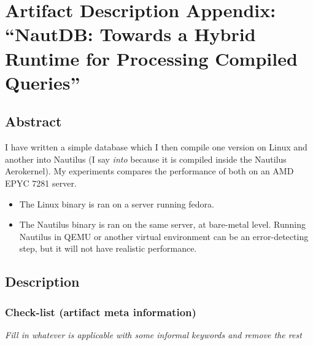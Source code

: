 \documentclass{IEEEtran}
\begin{document}

\appendices

\section{Artifact Description Appendix: ``NautDB: Towards a Hybrid Runtime for Processing Compiled Queries''}

\subsection{Abstract}

I have written a simple database which I then compile one version on Linux and another into Nautilus (I say \textit{into} because it is compiled inside the Nautilus Aerokernel). My experiments compares the performance of both on an AMD EPYC 7281 server.

\begin{itemize}
\item The Linux binary is ran on a server running fedora.
\item The Nautilus binary is ran on the same server, at bare-metal level. Running Nautilus in QEMU or another virtual environment can be an error-detecting step, but it will not have realistic performance.
\end{itemize}

\subsection{Description}

\subsubsection{Check-list (artifact meta information)}

{\em Fill in whatever is applicable with some informal keywords and remove the rest}
\end{document}
